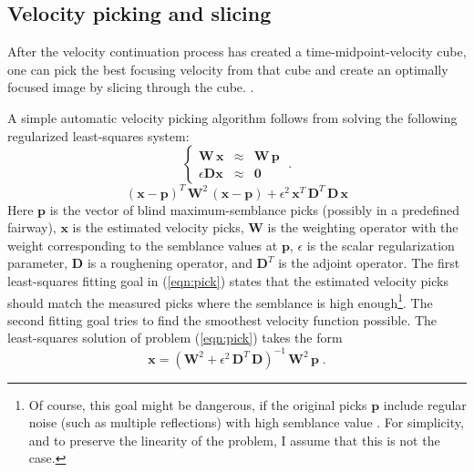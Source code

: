 
\subsection{Velocity picking and slicing}

After the velocity continuation process has created a time-midpoint-velocity
cube, one can pick the best focusing velocity from that cube and create an
optimally focused image by slicing through the cube. 
\cite[]{shurtleff,SEG-1984-S1.8,GEO57-01-00510059}.  \cite{SEG-2000-09920995} 

A simple automatic velocity picking algorithm follows from solving the
following regularized least-squares system:
\begin{equation}
  \label{eqn:pick}
  \left\{\begin{array}{rcl}
      \mathbf{W}\,\mathbf{x} & \approx & \mathbf{W}\,\mathbf{p} \\
      \epsilon \mathbf{D} \mathbf{x} & \approx & \mathbf{0}
    \end{array}\right.\;.
\end{equation}
\begin{equation}
  \label{eqn:ofpick}
(\mathbf{x}-\mathbf{p})^{T}\, \mathbf{W}^2\,(\mathbf{x}-\mathbf{p}) +
\epsilon^2\,\mathbf{x}^T\,\mathbf{D}^T\,\mathbf{D}\,\mathbf{x}
\end{equation}
Here $\mathbf{p}$ is the vector of blind maximum-semblance picks (possibly in a
predefined fairway), $\mathbf{x}$ is the estimated velocity picks, $\mathbf{W}$ is
the weighting operator with the weight corresponding to the semblance values
at $\mathbf{p}$, $\epsilon$ is the scalar regularization parameter, $\mathbf{D}$
is a roughening operator, and $\mathbf{D}^T$ is the adjoint operator.  The first
least-squares fitting goal in (\ref{eqn:pick}) states that the estimated
velocity picks should match the measured picks where the semblance is high
enough\footnote{Of course, this goal might be dangerous, if the original picks
  $\mathbf{p}$ include regular noise (such as multiple reflections) with high
  semblance value \cite[]{Toldi.sepphd.43}. For simplicity, and to preserve the
  linearity of the problem, I assume that this is not the case.}.  The second
fitting goal tries to find the smoothest velocity function possible.  The
least-squares solution of problem (\ref{eqn:pick}) takes the form
\begin{equation}
  \label{eqn:LS}
  \mathbf{x} = 
  \left(\mathbf{W}^2 + 
    \epsilon^2\,\mathbf{D}^T\,\mathbf{D}\right)^{-1}\,\mathbf{W}^2\,\mathbf{p}\;.
\end{equation}

